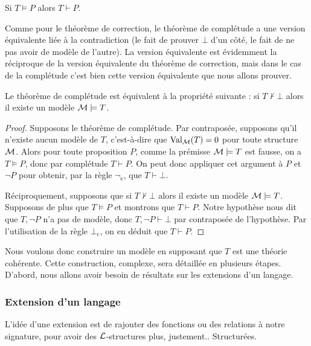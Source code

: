 \begin{them}
    Si $T\vDash P$ alors $T\vdash P$.
\end{them}

Comme pour le théorème de correction, le théorème de complétude a une version équivalente liée à la contradiction (le fait de prouver $\bot$ d'un côté, le fait de ne pas avoir de modèle de l'autre). La version équivalente est évidemment la réciproque de la version équivalente du théorème de correction, mais dans le cas de la complétude c'est bien cette version équivalente que nous allons prouver.

\begin{lem}
    Le théorème de complétude est équivalent à la propriété suivante : si $T\nvdash \bot$ alors il existe un modèle $\mathcal M\models T$.
\end{lem}

\begin{proof}
    Supposons le théorème de complétude. Par contraposée, supposons qu'il n'existe aucun modèle de $T$, c'est-à-dire que $\mathrm{Val}_{\mathcal M}(T)=0$ pour toute structure $\mathcal M$. Alors pour toute proposition $P$, comme la prémisse $\mathcal M\models T$ est fausse, on a $T\vDash P$, donc par complétude $T\vdash P$. On peut donc appliquer cet argument à $P$ et $\lnot P$ pour obtenir, par la règle $\lnot_\mathrm e$, que $T\vdash \bot$.

    Réciproquement, supposons que si $T\nvdash\bot$ alors il existe un modèle $\mathcal M\models T$. Supposons de plus que $T\vDash P$ et montrons que $T\vdash P$. Notre hypothèse nous dit que $T,\lnot P$ n'a pas de modèle, donc $T,\lnot P\vdash \bot$ par contraposée de l'hypothèse. Par l'utilisation de la règle $\bot_\mathrm c$, on en déduit que $T\vdash P$.
\end{proof}

Nous voulons donc construire un modèle en supposant que $T$ est une théorie cohérente. Cette construction, complexe, sera détaillée en plusieurs étapes. D'abord, nous allons avoir besoin de résultats sur les extensions d'un langage.

\subsubsection{Extension d'un langage}

L'idée d'une extension est de rajouter des fonctions ou des relations à notre signature, pour avoir des $\mathcal L$-structures plus, justement.. Structurées.


